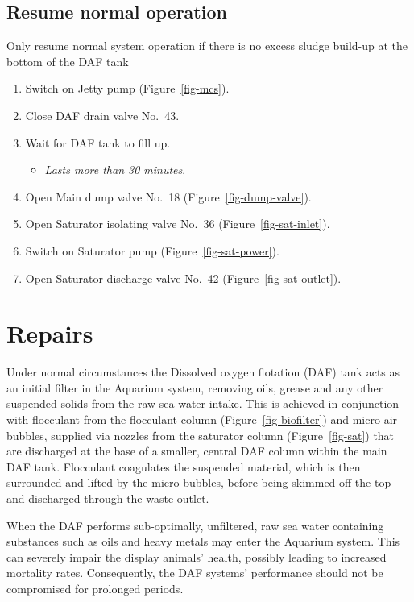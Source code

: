 \documentclass[
  letterpaper,
  DIV=11,
  numbers=noendperiod]{scrreprt}
\providecommand{\tightlist}{%
  \setlength{\itemsep}{0pt}\setlength{\parskip}{0pt}}\usepackage{longtable,booktabs,array}
\begin{document}
\hypertarget{resume-normal-operation}{%
\subsection{Resume normal operation}\label{resume-normal-operation}}

{Only resume normal system operation if there is no excess sludge
build-up at the bottom of the DAF tank}

\begin{enumerate}
\def\labelenumi{\arabic{enumi}.}
\setcounter{enumi}{34}
\tightlist
\item
  Switch on Jetty pump (Figure~\ref{fig-mcs}).
\item
  Close DAF drain valve No.~43.
\item
  Wait for DAF tank to fill up.

  \begin{itemize}
  \tightlist
  \item
    \emph{Lasts more than 30 minutes}.
  \end{itemize}
\item
  Open Main dump valve No.~18 (Figure~\ref{fig-dump-valve}).
\item
  Open Saturator isolating valve No.~36 (Figure~\ref{fig-sat-inlet}).
\item
  Switch on Saturator pump (Figure~\ref{fig-sat-power}).
\item
  Open Saturator discharge valve No.~42 (Figure~\ref{fig-sat-outlet}).
\end{enumerate}

\hypertarget{repairs}{%
\section{Repairs}\label{repairs}}

Under normal circumstances the Dissolved oxygen flotation (DAF) tank
acts as an initial filter in the Aquarium system, removing oils, grease
and any other suspended solids from the raw sea water intake. This is
achieved in conjunction with flocculant from the flocculant column
(Figure~\ref{fig-biofilter}) and micro air bubbles, supplied via nozzles
from the saturator column (Figure~\ref{fig-sat}) that are discharged at
the base of a smaller, central DAF column within the main DAF tank.
Flocculant coagulates the suspended material, which is then surrounded
and lifted by the micro-bubbles, before being skimmed off the top and
discharged through the waste outlet.

When the DAF performs sub-optimally, unfiltered, raw sea water
containing substances such as oils and heavy metals may enter the
Aquarium system. This can severely impair the display animals' health,
possibly leading to increased mortality rates. Consequently, the DAF
systems' performance should not be compromised for prolonged periods.
\end{document}
